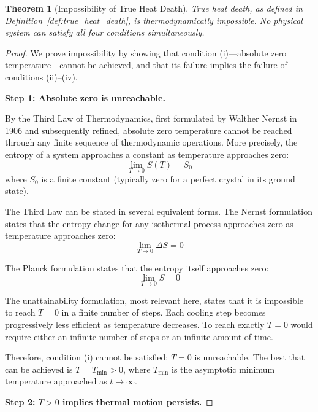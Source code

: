 \documentclass[12pt,a4paper]{article}
\newtheorem{theorem}{Theorem}[section]
\theoremstyle{definition}
\theoremstyle{remark}
\begin{document}
\begin{theorem}[Impossibility of True Heat Death]
\label{thm:impossible_heat_death}
True heat death, as defined in Definition~\ref{def:true_heat_death}, is thermodynamically impossible. No physical system can satisfy all four conditions simultaneously.
\end{theorem}

\begin{proof}
We prove impossibility by showing that condition (i)—absolute zero temperature—cannot be achieved, and that its failure implies the failure of conditions (ii)–(iv).

\textbf{Step 1: Absolute zero is unreachable.}

By the Third Law of Thermodynamics, first formulated by Walther Nernst in 1906 and subsequently refined, absolute zero temperature cannot be reached through any finite sequence of thermodynamic operations. More precisely, the entropy of a system approaches a constant as temperature approaches zero:
\begin{equation}
\lim_{T \to 0} S(T) = S_0
\end{equation}
where $S_0$ is a finite constant (typically zero for a perfect crystal in its ground state).

The Third Law can be stated in several equivalent forms. The Nernst formulation states that the entropy change for any isothermal process approaches zero as temperature approaches zero:
\begin{equation}
\lim_{T \to 0} \Delta S = 0
\end{equation}

The Planck formulation states that the entropy itself approaches zero:
\begin{equation}
\lim_{T \to 0} S = 0
\end{equation}

The unattainability formulation, most relevant here, states that it is impossible to reach $T = 0$ in a finite number of steps. Each cooling step becomes progressively less efficient as temperature decreases. To reach exactly $T = 0$ would require either an infinite number of steps or an infinite amount of time.

Therefore, condition (i) cannot be satisfied: $T = 0$ is unreachable. The best that can be achieved is $T = T_{\min} > 0$, where $T_{\min}$ is the asymptotic minimum temperature approached as $t \to \infty$.

\textbf{Step 2: $T > 0$ implies thermal motion persists.}


\end{proof}
\end{document}
